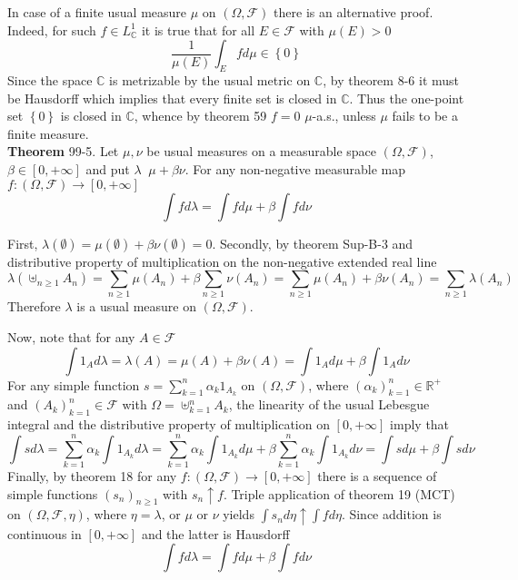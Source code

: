 \documentclass[a4paper]{article}
\newcommand{\obj}[1]{\left\{ #1 \right \}}
\newcommand{\clo}[1]{\left [ #1 \right ]}
\newcommand{\brac}[1]{\left ( #1 \right )}
\newcommand{\Real}{\mathbb{R}}
\newcommand{\Zinf}{\clo{ 0, +\infty }}
\newcommand{\Cplx}{\mathbb{C}}
\newcommand{\Fcal}{\mathcal{F}}
\newcommand{\defn}{\mathop{\overset{\Delta}{=}}\nolimits}
\begin{document}
In case of a finite usual measure $\mu$ on $\brac{\Omega, \Fcal}$ there is an alternative proof. Indeed, for such $f\in L^1_\Cplx$ it is true that for all $E\in \Fcal$ with $\mu\brac{E}>0$ \[\frac{1}{\mu\brac{E}} \int_E f d\mu \in \obj{0}\] Since the space $\Cplx$ is metrizable by the usual metric on $\Cplx$, by theorem 8-6 it must be Hausdorff which implies that every finite set is closed in $\Cplx$. Thus the one-point set $\obj{0}$ is closed in $\Cplx$, whence by theorem 59 $f=0$ $\mu$-a.s., unless $\mu$ fails to be a finite measure.\\

\label{thm:meas_comb_int} \noindent \textbf{Theorem} 99-5.
Let $\mu, \nu$ be usual measures on a measurable space $\brac{\Omega, \Fcal}$, $\beta \in \Zinf$ and put $\lambda\defn \mu+\beta \nu$. For any non-negative measurable map $f:\brac{\Omega, \Fcal}\to\Zinf$ \[\int f d\lambda = \int f d\mu + \beta \int f d\nu\]

First, $\lambda\brac{\emptyset} = \mu\brac{\emptyset}+\beta \nu\brac{\emptyset}=0$. Secondly, by theorem Sup-B-3 and distributive property of multiplication on the non-negative extended real line \[\lambda\brac{\uplus_{n\geq 1} A_n} = \sum_{n\geq1} \mu\brac{A_n}+\beta \sum_{n\geq1} \nu\brac{A_n} = \sum_{n\geq 1} \mu\brac{A_n} + \beta \nu\brac{A_n} = \sum_{n\geq1} \lambda\brac{A_n}\] Therefore $\lambda$ is a usual measure on $\brac{\Omega, \Fcal}$.

Now, note that for any $A\in \Fcal$ \[\int 1_A d\lambda = \lambda\brac{A} = \mu\brac{A} + \beta \nu\brac{A} = \int 1_A d\mu + \beta \int 1_A d\nu\] For any simple function $s=\sum_{k=1}^n \alpha_k 1_{A_k}$ on $\brac{\Omega, \Fcal}$, where $\brac{\alpha_k}_{k=1}^n\in \Real^+$ and $\brac{A_k}_{k=1}^n\in \Fcal$ with $\Omega = \uplus_{k=1}^n A_k$, the linearity of the usual Lebesgue integral and the distributive property of multiplication on $\Zinf$ imply that \[ \int s d\lambda = \sum_{k=1}^n \alpha_k \int 1_{A_k} d\lambda = \sum_{k=1}^n \alpha_k \int 1_{A_k} d\mu + \beta \sum_{k=1}^n \alpha_k \int 1_{A_k} d\nu = \int s d\mu + \beta \int s d\nu \] Finally, by theorem 18 for any $f:\brac{\Omega, \Fcal}\to \Zinf$ there is a sequence of simple functions $\brac{s_n}_{n\geq 1}$ with $s_n\uparrow f$. Triple application of theorem 19 (MCT) on $\brac{\Omega, \Fcal, \eta}$, where $\eta = \lambda$, or $\mu$ or $\nu$ yields $\int s_n d\eta \uparrow \int f d\eta$. Since addition is continuous in $\Zinf$ and the latter is Hausdorff \[\int f d\lambda = \int f d\mu + \beta \int f d\nu\]\\
\end{document}
